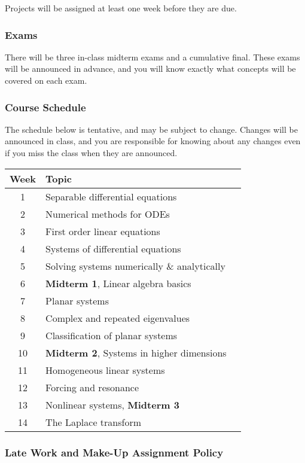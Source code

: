 \documentclass[10pt]{article}
\begin{document}
Projects will be assigned at least one week before they are due.

\subsubsection*{Exams}

There will be three in-class midterm exams and a cumulative final. These exams will be announced in advance, and you will know exactly what concepts will be covered on each exam.

\subsubsection*{Course Schedule} 

The schedule below is tentative, and may be subject to change. Changes will be announced in class, and you are responsible for knowing about any changes even if you miss the class when they are announced. 

\begin{center}
\begin{tabular}{|c|l|l|}
\hline
Week  & Topic \\ \hline
1 & Separable differential equations  \\
2 & Numerical methods for ODEs  \\
3 & First order linear equations  \\
4 & Systems of differential equations  \\
5 & Solving systems numerically \& analytically  \\
6 & \textbf{Midterm 1}, Linear algebra basics  \\
7 & Planar systems  \\
8 & Complex and repeated eigenvalues  \\
9 & Classification of planar systems  \\
10 & \textbf{Midterm 2}, Systems in higher dimensions  \\
11 & Homogeneous linear systems  \\
12 & Forcing and resonance  \\
13 & Nonlinear systems, \textbf{Midterm 3}  \\
14 & The Laplace transform  \\ \hline
\end{tabular}
\end{center}

\subsubsection*{Late Work and Make-Up Assignment Policy}
\end{document}

